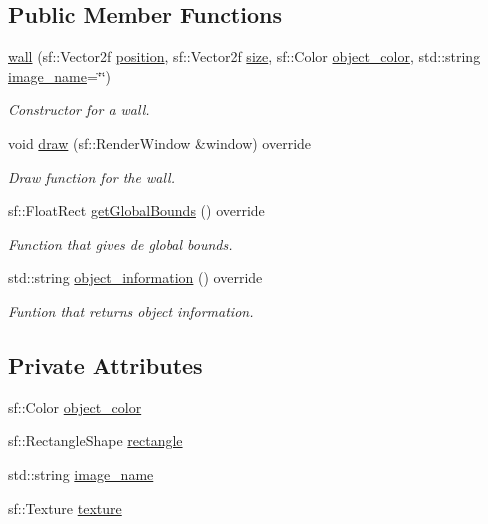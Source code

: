 \subsection*{Public Member Functions}
\begin{DoxyCompactItemize}
\item 
\hyperlink{classwall_ac9c0db974e7839223fc4eb18c51dac62}{wall} (sf\+::\+Vector2f \hyperlink{classdrawable_a34679fa5ae82eee65dfd6b1b9f3c7cb6}{position}, sf\+::\+Vector2f \hyperlink{classdrawable_aa3900dd7b69b439a3514e6acdb4a17b9}{size}, sf\+::\+Color \hyperlink{classwall_ada0e26614b5f30c0f675d179d517bafb}{object\+\_\+color}, std\+::string \hyperlink{classwall_acab3382f9e7092cf8bb62a5f88586d92}{image\+\_\+name}=\char`\"{}\char`\"{})
\begin{DoxyCompactList}\small\item\em Constructor for a wall. \end{DoxyCompactList}\item 
void \hyperlink{classwall_aa25b8377e1d9a209fabd2271294f05d0}{draw} (sf\+::\+Render\+Window \&window) override
\begin{DoxyCompactList}\small\item\em Draw function for the wall. \end{DoxyCompactList}\item 
sf\+::\+Float\+Rect \hyperlink{classwall_a317a464c879cfdf9464bd6f1b62d9101}{get\+Global\+Bounds} () override
\begin{DoxyCompactList}\small\item\em Function that gives de global bounds. \end{DoxyCompactList}\item 
std\+::string \hyperlink{classwall_aab1de4f144f176b134a967ba08747932}{object\+\_\+information} () override
\begin{DoxyCompactList}\small\item\em Funtion that returns object information. \end{DoxyCompactList}\end{DoxyCompactItemize}
\subsection*{Private Attributes}
\begin{DoxyCompactItemize}
\item 
sf\+::\+Color \hyperlink{classwall_ada0e26614b5f30c0f675d179d517bafb}{object\+\_\+color}
\item 
sf\+::\+Rectangle\+Shape \hyperlink{classwall_a29b74cbef8c1cb110c526fdf4a8f48ba}{rectangle}
\item 
std\+::string \hyperlink{classwall_acab3382f9e7092cf8bb62a5f88586d92}{image\+\_\+name}
\item 
sf\+::\+Texture \hyperlink{classwall_a03e6d768bc82f6320d85f19ce0346f95}{texture}
\end{DoxyCompactItemize}
